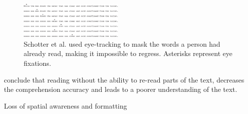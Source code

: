 \begin{figure}[htbp]
\centering
\includegraphics[width=0.45\textwidth]{Pics/trace_crosses}
\caption{Schotter et al. used eye-tracking to mask the words a person had already read, making it impossible to regress. Asterisks represent eye fixations.}
\label{fig:trace_cross}
\end{figure}

\citeauthor{schotter_dont_2014} conclude that reading without the ability to re-read parts of the text, decreases the comprehension accuracy and leads to a poorer understanding of the text.

Loss of spatial awareness and formatting
